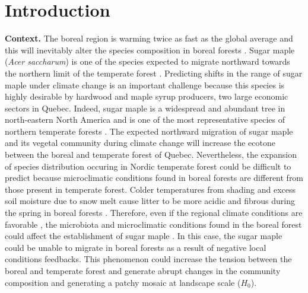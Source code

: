 


\newpage
\setcounter{page}{1}

\section{Introduction}

\textbf{Context.}  The boreal region is warming twice as fast as the global
average and  this will inevitably alter the species composition in boreal
forests \cite{Scheffer2012,Hughes2000}.  Sugar maple (\textit{Acer saccharum})
is one of the species expected to migrate northward towards the northern limit
of the temperate forest \cite{McKENNEY2007,Goldblum2005}. Predicting shifts in
the range of sugar maple under climate change is an important challenge
because this species is highly desirable by hardwood and maple syrup
producers, two large economic sectors in Quebec. Indeed, sugar maple is a
widespread and abundant tree in north-eastern North America and is one of the
most representative species of northern temperate forests
\cite{Graignic2013,Messaoud2007,Kellman2004,Barras1998}. The expected
northward migration of sugar maple and its vegetal community during climate
change will increase the ecotone between the boreal and temperate forest of
Quebec. Nevertheless, the expansion of species distribution occuring in Nordic
temperate forest could be difficult to predict because microclimatic
conditions found in boreal forests are different from those present in
temperate forest. Colder temperatures from shading and excess soil moisture
due to snow melt cause litter to be more acidic and fibrous during the spring
in boreal forests . Therefore, even if the regional climate conditions are
favorable \cite{Kellman2004}, the microbiota and microclimatic conditions
found in the boreal forest could affect the establishment of sugar maple
\cite{Kellman2004,Moore2008,DeFrenne2013,Barras1998}. In this case, the sugar
maple could be unable to migrate in boreal forests as a result of negative
local conditions feedbacks. This phenomenon could increase the tension between
the boreal and temperate forest and generate abrupt changes in the community
composition and generating a patchy mosaic at landscape scale
(\textbf{$H_0$}).\\

